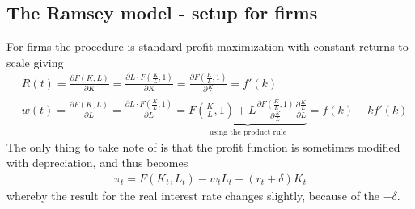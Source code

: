 \documentclass[12pt, a4paper]{article}
\begin{document}
\begin{spacing}{1.213}
\subsection{The Ramsey model - setup for firms }
For firms the procedure is standard profit maximization with constant returns to scale giving 
\begin{align*}
&R(t) = \frac{\partial F(K,L)}{\partial K} = \frac{\partial L \cdot F(\frac{K}{L},1)}{\partial K} = \frac{\partial F(\frac{K}{L},1)}{\partial \frac{K}{L}} = f'(k) \\
&w(t) =  \frac{\partial F(K,L)}{\partial L} = \frac{\partial L \cdot F(\frac{K}{L},1)}{\partial L} =\underbrace{F(\frac{K}{L},1) + L\frac{\partial F(\frac{K}{L},1)}{\partial \frac{K}{L}} \frac{\partial \frac{K}{L}}{\partial L}}_{\textrm{using the product rule}} =  f(k) - kf'(k)
\end{align*}
The only thing to take note of is that the profit function is sometimes modified with depreciation, and thus becomes
\begin{align*}
\pi_t = F(K_t,L_t) - w_tL_t - (r_t+\delta)K_t
\end{align*}
whereby the result for the real interest rate changes slightly, because of the $-\delta$.


\end{spacing}
\end{document}
